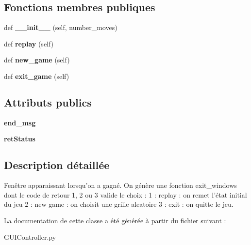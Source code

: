 \subsection*{Fonctions membres publiques}
\begin{DoxyCompactItemize}
\item 
\mbox{\label{classGUIController_1_1Exit__window_abcd85e5eafb07d76064dbac429440115}} 
def {\bfseries \+\_\+\+\_\+init\+\_\+\+\_\+} (self, number\+\_\+moves)
\item 
\mbox{\label{classGUIController_1_1Exit__window_ac93716ac20634c7541f3d060a0681d0a}} 
def {\bfseries replay} (self)
\item 
\mbox{\label{classGUIController_1_1Exit__window_a823091ef6bb5dafea773ee3fe606fafd}} 
def {\bfseries new\+\_\+game} (self)
\item 
\mbox{\label{classGUIController_1_1Exit__window_ab54a88f5468cb376420ce52f2fcd7d2d}} 
def {\bfseries exit\+\_\+game} (self)
\end{DoxyCompactItemize}
\subsection*{Attributs publics}
\begin{DoxyCompactItemize}
\item 
\mbox{\label{classGUIController_1_1Exit__window_a2bff0f28024058228d987a7b03b97ccc}} 
{\bfseries end\+\_\+msg}
\item 
\mbox{\label{classGUIController_1_1Exit__window_ab554c57f2b50a1c9a0521fc30d3face6}} 
{\bfseries ret\+Status}
\end{DoxyCompactItemize}


\subsection{Description détaillée}
\begin{DoxyVerb}Fenêtre apparaissant lorsqu'on a gagné. On génère une fonction exit_windows dont le code de retour 1, 2 ou 3 valide le choix :
1 : replay : on remet l'état initial du jeu
2 : new game : on choisit une grille aleatoire
3 : exit : on quitte le jeu.
\end{DoxyVerb}
 

La documentation de cette classe a été générée à partir du fichier suivant \+:\begin{DoxyCompactItemize}
\item 
G\+U\+I\+Controller.\+py\end{DoxyCompactItemize}
